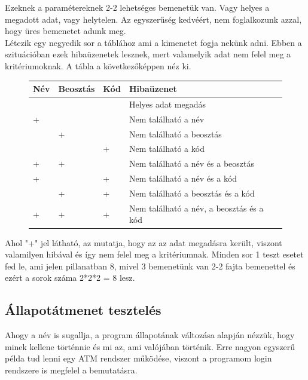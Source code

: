 Ezeknek a paramétereknek 2-2 lehetséges bemenetük van. Vagy helyes a megadott adat, vagy helytelen. Az egyszerűség kedvéért, nem foglalkozunk azzal, hogy üres bemenetet adunk meg.\\

Létezik egy negyedik sor a táblához ami a kimenetet fogja nekünk adni. Ebben a szituációban ezek hibaüzenetek lesznek, mert valamelyik adat nem felel meg a kritériumoknak. A tábla a következőképpen néz ki.

\begin{figure} [h]
	\begin{center}
		\begin{tabular}{| p{2cm} | p{2cm} | p{2cm} | p{5cm} |}
			\hline
			Név & Beosztás & Kód & Hibaüzenet\\
			\hline
			& & & Helyes adat megadás\\
			\hline
			+ & & & Nem található a név\\
			\hline
			& + & & Nem található a beosztás\\
			\hline
			&  & + & Nem található a kód\\
			\hline
			+ & + & & Nem található a név és a beosztás\\
			\hline
			+ & & + & Nem található a név és a kód\\
			\hline
			& + &  +& Nem található a beosztás és a kód\\
			\hline
			+ & + & + & Nem található a név, a beosztás és a kód\\
			\hline
		\end{tabular}
	\end{center}
\end{figure}

Ahol "+" jel látható, az mutatja, hogy az az adat megadásra került, viszont valamilyen hibával és így nem felel meg a kritériumnak. Minden sor 1 teszt esetet fed le, ami jelen pillanatban 8, mivel 3 bemenetünk van 2-2 fajta bemenettel és ezért a sorok száma 2*2*2 = 8 lesz.

\subsection{Állapotátmenet tesztelés} Ahogy a név is sugallja, a program állapotának változása alapján nézzük, hogy minek kellene történnie és mi az, ami valójában történik. Erre nagyon egyszerű példa tud lenni egy ATM rendszer működése, viszont a programom login rendszere is megfelel a bemutatásra. \\

